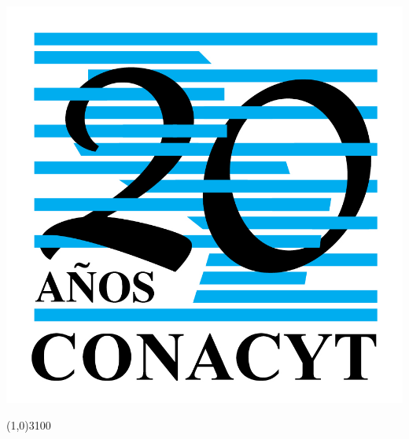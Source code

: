 \documentclass[a0,portrait,spanish,20pt]{a0poster}
\begin{document}
\begin{minipage}[b]{1\linewidth}
\begin{minipage}{0.15\linewidth}
\end{minipage}
\hspace*{1cm}
\begin{minipage}{0.15\linewidth}
\centering
\includegraphics[width=1\columnwidth]{figures/LogoCTS-20.jpg}
\end{minipage}


\end{minipage}

\line(1,0){3100}

%


\end{document}
